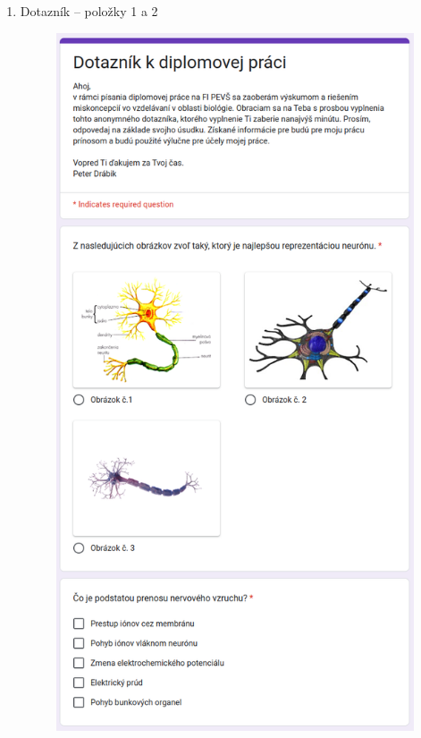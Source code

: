 \begin{enumerate}[leftmargin=*]
    \item Dotazník {--} položky 1 a 2 \label{att:dot1}
    \begin{figure}[!htbp]
        \centering
        \includegraphics[width=11cm]{img/dot1.png}
    \end{figure}
    \newpage


\end{enumerate}
